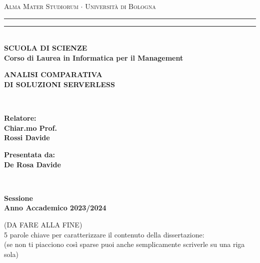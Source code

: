 \documentclass[12pt,a4paper,twoside]{book}
\newcommand{\rom}[1]{\uppercase\expandafter{\romannumeral #1\relax}}
\begin{document}
\pagestyle{empty}
\begin{titlepage}
\begin{center}
    {{\Large{\textsc{Alma Mater Studiorum $\cdot$ Università di Bologna}}}}
    \rule[0.1cm]{\textwidth}{0.1mm}
    \rule[0.5cm]{\textwidth}{0.6mm}\\
    {\small{\bf SCUOLA DI SCIENZE\\
    Corso di Laurea in Informatica per il Management}}
\end{center}

\vspace{25mm}

\begin{center}
    {\LARGE{\bf ANALISI COMPARATIVA }}\\
    \vspace{3mm}
    {\LARGE{\bf DI SOLUZIONI SERVERLESS}}\\
\end{center}

\vspace{60mm}
\par
\noindent
\begin{minipage}[t]{0.04\textwidth}
~
\end{minipage}
\begin{minipage}[t]{0.4\textwidth}
{\large{\bf Relatore:\\
Chiar.mo Prof.\\
Rossi Davide}}
\end{minipage}
\hfill
\begin{minipage}[t]{0.4\textwidth}\raggedleft
{\large{\bf Presentata da:\\
De Rosa Davide}}
\end{minipage}
\begin{minipage}[t]{0.04\textwidth}
~
\end{minipage}

\vspace{30mm}

\begin{center}
    {\large{\bf \rom{2} Sessione\\
    Anno Accademico 2023/2024 }}
\end{center}
\end{titlepage}

\restoregeometry
\newpage
\begin{center}
    (DA FARE ALLA FINE)\\
    5 parole chiave per caratterizzare il contenuto della dissertazione:\\ (se non ti piacciono così sparse puoi anche semplicamente scriverle su una riga sola)
\end{center}
\end{document}
